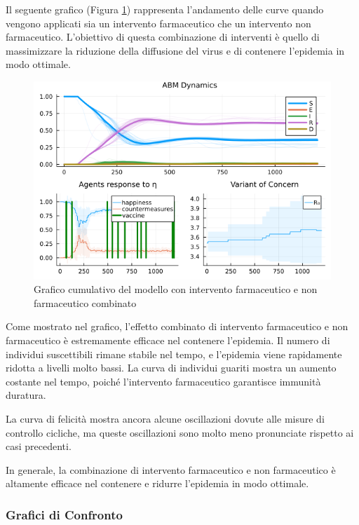 Il seguente grafico (Figura \ref{fig:abm_combined_intervent}) 
rappresenta l'andamento delle curve quando vengono applicati sia 
un intervento farmaceutico che un intervento non farmaceutico. 
L'obiettivo di questa combinazione di interventi è quello di 
massimizzare la riduzione della diffusione del virus e di contenere 
l'epidemia in modo ottimale.

\begin{figure}[H]
    \begin{center}
		\includegraphics[width=\textwidth]{img/SocialNetworkABM_ALL.png}
		\caption{Grafico cumulativo del modello con intervento farmaceutico e non farmaceutico combinato}
		\label{fig:abm_combined_intervent}
	\end{center}
\end{figure}

Come mostrato nel grafico, l'effetto combinato di intervento 
farmaceutico e non farmaceutico è estremamente efficace nel 
contenere l'epidemia. Il numero di individui suscettibili 
rimane stabile nel tempo, e l'epidemia viene rapidamente ridotta 
a livelli molto bassi. La curva di individui guariti mostra un 
aumento costante nel tempo, poiché l'intervento farmaceutico 
garantisce immunità duratura.

La curva di felicità mostra ancora alcune oscillazioni dovute 
alle misure di controllo cicliche, ma queste oscillazioni sono 
molto meno pronunciate rispetto ai casi precedenti.

In generale, la combinazione di intervento farmaceutico e non 
farmaceutico è altamente efficace nel contenere e ridurre 
l'epidemia in modo ottimale.

\subsubsection{Grafici di Confronto}

